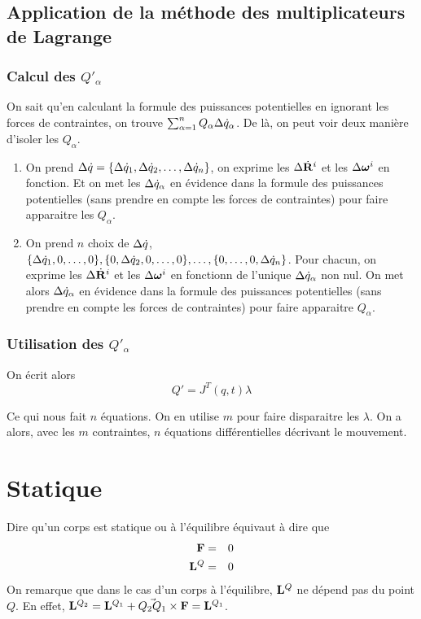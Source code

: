 \subsection{Application de la méthode des multiplicateurs de Lagrange}

\subsubsection{Calcul des $Q'_\alpha$}
On sait qu'en calculant la formule des puissances potentielles en ignorant les forces de contraintes,
on trouve $\sum_{\alpha = 1}^n Q_\alpha \Delta \dot{q}_\alpha$.
De là, on peut voir deux manière d'isoler les $Q_\alpha$.
\begin{enumerate}
	\item On prend $\Delta \dot{q} = \{\Delta \dot{q}_1, \Delta \dot{q}_2, \ldots, \Delta \dot{q}_n\}$, on exprime les $\Delta \dot{\bf R}^i$ et les $\Delta {\bm \omega}^i$ en fonction.
		Et on met les $\Delta \dot{q}_\alpha$ en évidence dans la formule des puissances potentielles (sans prendre en compte les forces de contraintes) pour faire apparaitre les $Q_\alpha$.
	\item On prend $n$ choix de $\Delta \dot{q}$, $\{\Delta \dot{q}_1, 0, \ldots, 0\}, \{0, \Delta \dot{q}_2, 0, \ldots, 0\}, \ldots, \{0, \ldots, 0, \Delta \dot{q}_n\}$.
		Pour chacun, on exprime les $\Delta \dot{\bf R}^i$ et les $\Delta {\bm \omega}^i$ en fonctionn de l'unique $\Delta \dot{q}_\alpha$ non nul.
		On met alors $\Delta \dot{q}_\alpha$ en évidence dans la formule des puissances potentielles (sans prendre en compte les forces de contraintes) pour faire apparaitre $Q_\alpha$.
\end{enumerate}

\subsubsection{Utilisation des $Q'_\alpha$}
On écrit alors
\[ Q' = J^T(q, t) \lambda \]

Ce qui nous fait $n$ équations.
On en utilise $m$ pour faire disparaitre les $\lambda$.
On a alors, avec les $m$ contraintes, $n$ équations différentielles décrivant le mouvement.

\section{Statique}

Dire qu'un corps est statique ou à l'équilibre équivaut à dire que
\begin{eqnarray*}
	{\bf F} &=& 0\\
	{\bf L}^Q &=& 0
\end{eqnarray*}
On remarque que dans le cas d'un corps à l'équilibre, ${\bf L}^Q$ ne dépend pas du point $Q$.
En effet, ${\bf L}^{Q_2} = {\bf L}^{Q_1} + \vec{Q_2Q_1} \times {\bf F} = {\bf L}^{Q_1}$.

